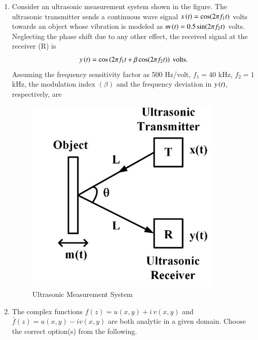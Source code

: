 \documentclass[journal,12pt,onecolumn]{IEEEtran}
\theoremstyle{remark}
\begin{document}
\begin{enumerate}
\item Consider an ultrasonic measurement system shown in the figure. The ultrasonic transmitter  sends a continuous wave signal $x\brak{t} = \cos(2 \pi f_1 t)$ volts towards an object whose vibration is modeled as $m\brak{t} = 0.5 \sin(2 \pi f_2 t)$ volts. Neglecting the phase shift due to any other effect, the received signal at the receiver (R) is
\[
y\brak{t} = \cos \left( 2 \pi f_1 t + \beta \cos (2 \pi f_2 t) \right) \text{ volts}.
\]
Assuming the frequency sensitivity factor as 500 Hz/volt, $f_1 = 40$ kHz, $f_2 = 1$ kHz, the modulation index $(\beta)$ and the frequency deviation in $y\brak{t}$, respectively, are
\par\hfill{}
\begin{figure}[H]
    \centering
    \includegraphics[width=0.3\columnwidth]{Figs/Q-48.png}
    \caption{Ultrasonic Measurement System}
    \label{48}
\end{figure}
    \begin{enumerate}
    \end{enumerate}

\item The complex functions $f(z) = u(x,y) + i \, v(x,y)$ and $\bar{f}(z) = u(x,y) - i v(x,y)$ are both analytic in a given domain. Choose the correct option(s) from the following.
\par\hfill{}
    \begin{enumerate}
    \end{enumerate}


\end{enumerate}
\end{document}

